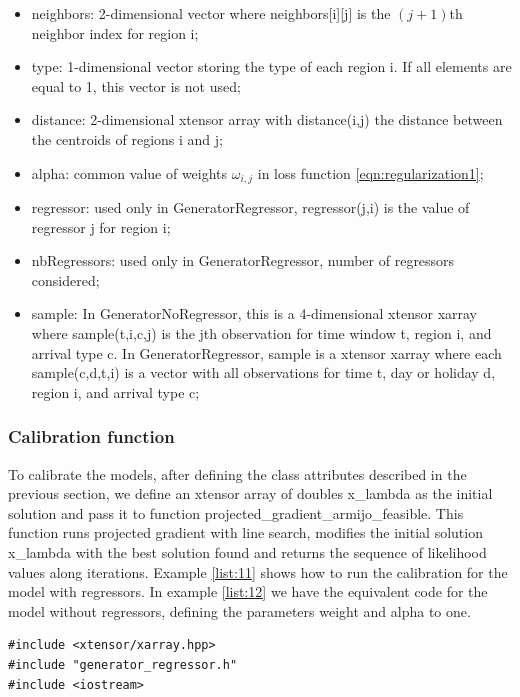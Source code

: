 \documentclass[article]{jss}
\begin{document}
{\begin{itemize}
    and parameter  $\varepsilon$ in \eqref{eqn:feassetref1} when using GeneratorRegressor;
    \item neighbors: 2-dimensional vector where neighbors[i][j] is the 
    $(j+1)$th neighbor index for
    region i;
    \item type: 1-dimensional vector storing the type of each region i. If all elements are equal to 1, this vector is not used;
    \item distance: 2-dimensional xtensor array
    with distance(i,j)
  the distance between the centroids of regions i and j;
    \item alpha: common value of weights \(\omega_{i,j}\) in loss function \eqref{eqn:regularization1};
    \item regressor: used only in GeneratorRegressor,  regressor(j,i) is the value of regressor j for region i;
    \item nbRegressors: used only in GeneratorRegressor, number of regressors considered;
    \item sample: In GeneratorNoRegressor, this is a 4-dimensional xtensor xarray where sample(t,i,c,j) is the jth observation for time window t, region i, and arrival type c. In GeneratorRegressor, sample is a xtensor xarray where each sample(c,d,t,i) is a vector with all observations for time t, day or holiday d, region i, and arrival type c; 
\end{itemize}

\subsubsection{Calibration function}

To calibrate the models, after defining the class attributes described in the previous section, we define an xtensor array of doubles x\_lambda as the initial solution and pass it to function projected\_gradient\_armijo\_feasible. This function runs projected gradient with line search, modifies the initial solution x\_lambda with the best solution found and returns the sequence of likelihood values along iterations. Example \ref{list:11} shows how to run the  calibration for the model with regressors. In example \ref{list:12} we have the equivalent code for the model without regressors, defining the parameters weight and alpha to one.


\begin{lstlisting}[label={list:11},caption=Calibration of the model with regressors in C++]
#include <xtensor/xarray.hpp>
#include "generator_regressor.h"
#include <iostream>


\end{lstlisting}}
\end{document}
